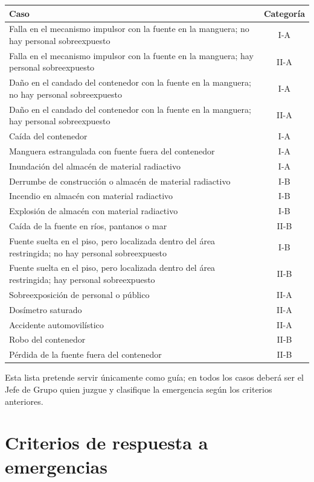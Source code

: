 \begin{longtable}{p{}c}
\textbf{Caso} & \textbf{Categoría} \\
\hline
Falla en el mecanismo impulsor con la fuente en la manguera; no hay personal sobreexpuesto & I-A \\
Falla en el mecanismo impulsor con la fuente en la manguera; hay personal sobreexpuesto & II-A \\
Daño en el candado del contenedor con la fuente en la manguera; no hay personal sobreexpuesto & I-A \\
Daño en el candado del contenedor con la fuente en la manguera; hay personal sobreexpuesto & II-A \\
Caída del contenedor & I-A \\
Manguera estrangulada con fuente fuera del contenedor & I-A \\
Inundación del almacén de material radiactivo & I-A \\
Derrumbe de construcción o almacén de material radiactivo & I-B \\
Incendio en almacén con material radiactivo & I-B \\
Explosión de almacén con material radiactivo & I-B \\
Caída de la fuente en ríos, pantanos o mar & II-B \\
Fuente suelta en el piso, pero localizada dentro del área restringida; no hay personal sobreexpuesto & I-B \\
Fuente suelta en el piso, pero localizada dentro del área restringida; hay personal sobreexpuesto & II-B \\
Sobreexposición de personal o público & II-A \\
Dosímetro saturado & II-A \\
Accidente automovilístico & II-A \\
Robo del contenedor & II-B \\
Pérdida de la fuente fuera del contenedor & II-B \\
\end{longtable}

Esta lista pretende servir únicamente como guía; en todos los casos deberá ser el Jefe de Grupo quien juzgue y clasifique la emergencia según los criterios anteriores.

\section{Criterios de respuesta a emergencias}

